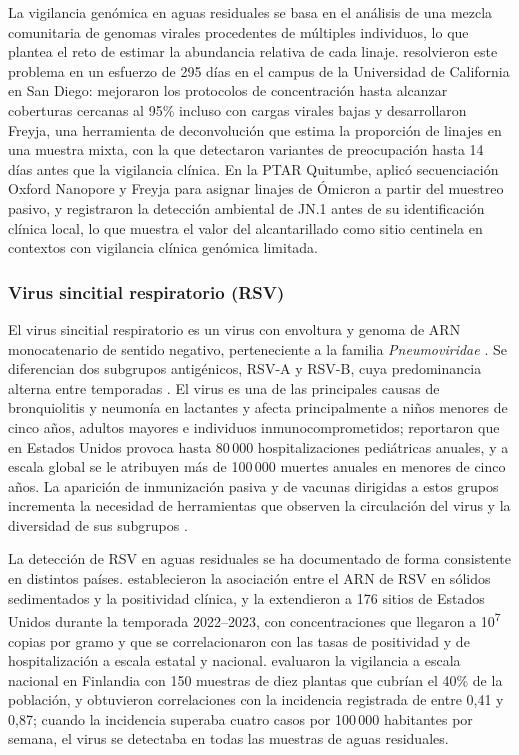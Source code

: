 La vigilancia genómica en aguas residuales se basa en el análisis de una mezcla comunitaria de genomas virales procedentes de múltiples individuos, lo que plantea el reto de estimar la abundancia relativa de cada linaje.  resolvieron este problema en un esfuerzo de 295 días en el campus de la Universidad de California en San Diego: mejoraron los protocolos de concentración hasta alcanzar coberturas cercanas al 95\% incluso con cargas virales bajas y desarrollaron Freyja, una herramienta de deconvolución que estima la proporción de linajes en una muestra mixta, con la que detectaron variantes de preocupación hasta 14 días antes que la vigilancia clínica. En la PTAR Quitumbe,  aplicó secuenciación Oxford Nanopore y Freyja para asignar linajes de Ómicron a partir del muestreo pasivo, y registraron la detección ambiental de JN.1 antes de su identificación clínica local, lo que muestra el valor del alcantarillado como sitio centinela en contextos con vigilancia clínica genómica limitada.

\subsubsection{Virus sincitial respiratorio (RSV)}

El virus sincitial respiratorio es un virus con envoltura y genoma de ARN monocatenario de sentido negativo, perteneciente a la familia \textit{Pneumoviridae} \cite{Murray_2021}. Se diferencian dos subgrupos antigénicos, RSV-A y RSV-B, cuya predominancia alterna entre temporadas \cite{Lansivaara_2024,Zambrana_2024}. El virus es una de las principales causas de bronquiolitis y neumonía en lactantes y afecta principalmente a niños menores de cinco años, adultos mayores e individuos inmunocomprometidos;  reportaron que en Estados Unidos provoca hasta 80\,000 hospitalizaciones pediátricas anuales, y a escala global se le atribuyen más de 100\,000 muertes anuales en menores de cinco años. La aparición de inmunización pasiva y de vacunas dirigidas a estos grupos incrementa la necesidad de herramientas que observen la circulación del virus y la diversidad de sus subgrupos \cite{Mercier_2025}.

La detección de RSV en aguas residuales se ha documentado de forma consistente en distintos países.  establecieron la asociación entre el ARN de RSV en sólidos sedimentados y la positividad clínica, y  la extendieron a 176 sitios de Estados Unidos durante la temporada 2022--2023, con concentraciones que llegaron a 10\textsuperscript{7} copias por gramo y que se correlacionaron con las tasas de positividad y de hospitalización a escala estatal y nacional.  evaluaron la vigilancia a escala nacional en Finlandia con 150 muestras de diez plantas que cubrían el 40\% de la población, y obtuvieron correlaciones con la incidencia registrada de entre 0,41 y 0,87; cuando la incidencia superaba cuatro casos por 100\,000 habitantes por semana, el virus se detectaba en todas las muestras de aguas residuales.

